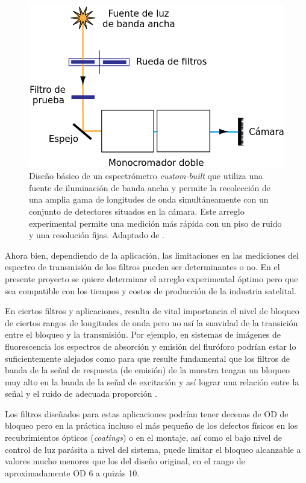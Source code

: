 \documentclass{ctuthesis}
\begin{document}
\begin{figure}[H]
	\centering
	\includegraphics[scale=0.8]{Figs/plan_de_tesis/med_mets_prevs.png}
	\caption{Diseño básico de un espectrómetro \textit{custom-built} que 
	utiliza una fuente de iluminación de banda ancha y permite la recolección 
	de una 		amplia gama de
		longitudes de onda simultáneamente con un conjunto de detectores 
		situados en la cámara. Este 
		arreglo experimental permite una medición más rápida con un piso de 
		ruido y una resolución fijas. Adaptado de 
		\cite{Semrock}.}
	\label{fig:med_prev}
\end{figure}




Ahora bien, dependiendo de la aplicación, las limitaciones en las mediciones 
del espectro de transmisión de los filtros pueden ser determinantes o no. En el 
presente proyecto se quiere determinar el arreglo experimental óptimo pero que 
sea compatible con los tiempos y costos de producción de la industria satelital.

En ciertos filtros y aplicaciones, resulta de vital importancia 
el 
nivel de bloqueo de ciertos rangos de longitudes de onda pero no así la 
suavidad de la transición entre el bloqueo y la transmisión. Por ejemplo, en 
sistemas de 
imágenes de fluorescencia los espectros de absorción y emisión del fluróforo 
podrían estar lo suficientemente alejados como para que resulte fundamental que 
los filtros de banda de la señal de respuesta (de emisión) de la muestra tengan 
un bloqueo muy alto en la banda de la señal de excitación y así lograr una 
relación entre la señal y el ruido de adecuada proporción \cite{Grecco2016}. 

Los filtros 
diseñados para estas aplicaciones podrían tener decenas de OD de bloqueo pero 
en 
la práctica incluso el más pequeño de los defectos físicos en los 
recubrimientos ópticos (\textit{coatings}) o en el montaje, así como el bajo 
nivel de control de luz parásita a nivel del sistema, puede limitar el 
bloqueo alcanzable a valores mucho menores que los del diseño original, en el 
rango de aproximadamente OD 6 a quizás 10.%
\end{document}
